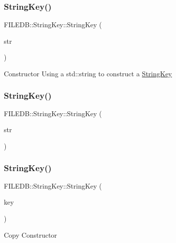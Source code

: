 \subsubsection{\texorpdfstring{StringKey()}{StringKey()}\hspace{0.1cm}{\footnotesize\ttfamily [6/8]}}
{\footnotesize\ttfamily F\+I\+L\+E\+D\+B\+::\+String\+Key\+::\+String\+Key (\begin{DoxyParamCaption}\item[{const std\+::string \&}]{str }\end{DoxyParamCaption})}

Constructor Using a std\+::string to construct a \mbox{\hyperlink{classFILEDB_1_1StringKey}{String\+Key}} \mbox{\label{classFILEDB_1_1StringKey_a7710b1f6cafd04e1e178d24019e81ae5}} 
\subsubsection{\texorpdfstring{StringKey()}{StringKey()}\hspace{0.1cm}{\footnotesize\ttfamily [7/8]}}
{\footnotesize\ttfamily F\+I\+L\+E\+D\+B\+::\+String\+Key\+::\+String\+Key (\begin{DoxyParamCaption}\item[{const char $\ast$}]{str }\end{DoxyParamCaption})}

\mbox{\label{classFILEDB_1_1StringKey_a042b0231e08bfbd9f9bc3802d95d0e9c}} 
\subsubsection{\texorpdfstring{StringKey()}{StringKey()}\hspace{0.1cm}{\footnotesize\ttfamily [8/8]}}
{\footnotesize\ttfamily F\+I\+L\+E\+D\+B\+::\+String\+Key\+::\+String\+Key (\begin{DoxyParamCaption}\item[{const \mbox{\hyperlink{classFILEDB_1_1StringKey}{String\+Key}} \&}]{key }\end{DoxyParamCaption})}

Copy Constructor \mbox{\label{classFILEDB_1_1StringKey_a45b2488c42cb895e30b927366ae96785}} 
